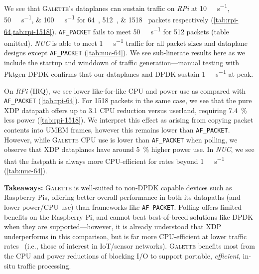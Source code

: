 \documentclass[comsoc, conference, times]{IEEEtran}
\newcommand{\ourtech}{\textsc{Galette}}
\newcommand{\afp}{\texttt{AF\_PACKET}}
\newcommand{\fakepara}[1]{\noindent\textbf{#1:}}
\begin{document}
We see that \ourtech{}'s dataplanes can sustain traffic on \emph{RPi} at \qtylist[list-units = single]{10;50;100}{\mega\bit\per\second} for \qtylist[list-units = single]{64;512;1518}{\byte} packets respectively (\cref{tab:rpi-64,tab:rpi-1518}).
\afp{} fails to meet \qty{50}{\mega\bit\per\second} for \qty{512}{\byte} packets (table omitted). %
\emph{NUC} is able to meet \qty{1}{\giga\bit\per\second} traffic for all packet sizes and dataplane designs except \afp{} (\cref{tab:nuc-64}).
We see sub-linerate results here as we include the startup and winddown of traffic generation---manual testing with Pktgen-DPDK confirms that our dataplanes and DPDK sustain \qty{1}{\giga\bit\per\second} at peak.

On \emph{RPi} (IRQ), we see lower like-for-like CPU and power use as compared with \afp{} (\cref{tab:rpi-64}).
For \qty{1518}{\byte} packets in the same case, we see that the pure XDP datapath offers up to \qty{3.1}{\times} CPU reduction versus userland, requiring \qty{7.4}{\percent} less power (\cref{tab:rpi-1518}).
We interpret this effect as arising from copying packet contents into UMEM frames, however this remains lower than \afp.
However, while \ourtech{} CPU use is lower than \afp{} when polling, we observe that XDP dataplanes have around \qty{5}{\percent} higher power use.
In \emph{NUC}, we see that the fastpath is always more CPU-efficient for rates beyond \qty{1}{\mega\bit\per\second} (\cref{tab:nuc-64}).

\fakepara{Takeaways}
\ourtech{} is well-suited to non-DPDK capable devices such as Raspberry Pis, offering better overall performance in both its datapaths (and lower power/CPU use) than frameworks like \afp.
Polling offers limited benefits on the Raspberry Pi, and cannot beat best-of-breed solutions like DPDK when they are supported---however, it is already understood that XDP underperforms in this comparison, but is far more CPU-efficient at lower traffic rates~\parencite{DBLP:journals/tnsm/MianoRBBL21,DBLP:conf/conext/Hoiland-Jorgensen18} (i.e., those of interest in IoT/sensor networks).
\ourtech{} benefits most from the CPU and power reductions of blocking I/O to support portable, \emph{efficient}, in-situ traffic processing.
\end{document}
